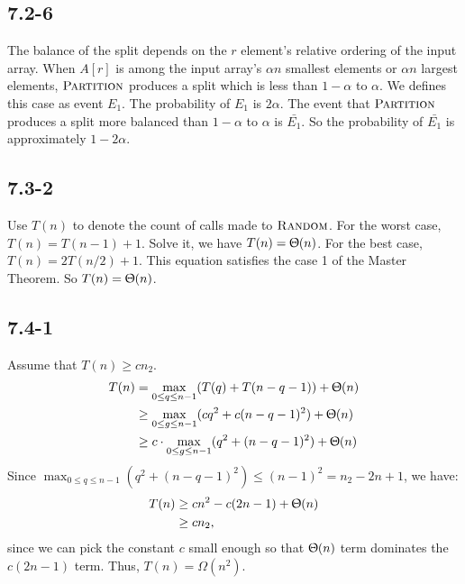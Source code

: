 \documentclass{book}
\begin{document}
\begin{CJK}{UTF8}{gkai}
\subsection*{7.2-6} The balance of the split depends on the $r$ element's relative 
ordering of the input array. When $A[r]$ is among the input array's $\alpha n$ 
smallest elements or $\alpha n$ largest elements, $\textnormal{\scshape Partition}$ produces a 
split which is less than $1-\alpha$ to $\alpha$.  We defines this case as event 
$E_1$.  The probability of $E_1$ is $2\alpha$. The event that $\textnormal{\scshape Partition}$ 
produces a split more balanced than $1-\alpha$ to $\alpha$ is $\bar{E_1}$. So 
the probability of $\bar{E_1}$ is approximately $1-2\alpha$.

\subsection*{7.3-2} Use $T(n)$ to denote the count of calls made to $\textnormal{\scshape Random}$.  
For the worst case, $T(n) = T(n-1) + 1$. Solve it, we have $T(n) = \Uptheta(n)$.  
For the best case, $T(n) = 2T(n/2) + 1$. This equation satisfies the case 1 of 
the Master Theorem. So $T(n) = \Uptheta(n)$.

\subsection*{7.4-1} Assume that $T(n) \ge cn_2$.
\begin{align*}
T(n) & = \max_{0\le q \le n-1} (T(q)+T(n-q-1)) + \Uptheta(n) \\
& \ge \max_{0\le g \le n-1} (cq^2 + c(n-q-1)^2) + \Uptheta(n) \\
& \ge c \cdot \max_{0\le g \le n-1} (q^2 + (n-q-1)^2) + \Uptheta(n)
\end{align*}
Since $\max_{0\le q \le n-1}(q^2+(n-q-1)^2) \le (n-1)^2 = n_2-2n+1$, we have:
\begin{align*}
T(n) & \ge cn^2-c(2n-1) + \Uptheta(n) \\
& \ge cn_2,
\end{align*}
since we can pick the constant $c$ small enough so that $\Uptheta(n)$ term 
dominates the $c(2n-1)$ term. Thus, $T(n) = \Omega(n^2)$.


\end{CJK}
\end{document}
